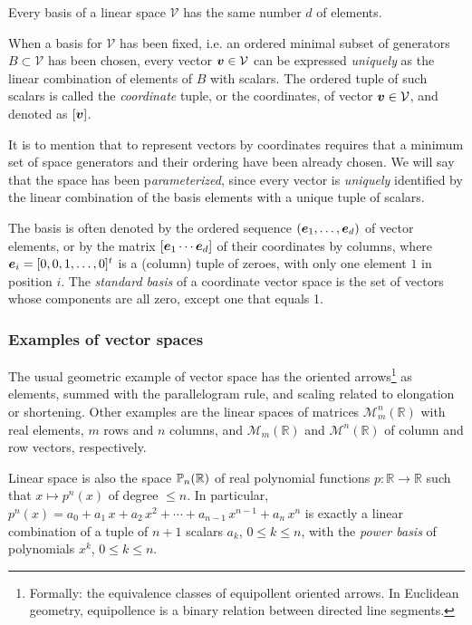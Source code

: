 Every basis of a linear space $\mathcal{V}$ has the same number $d$ of elements. 

When a basis for $\mathcal{V}$ has been fixed, i.e. an ordered minimal subset of generators ${B} \subset \mathcal{V}$  has been chosen, every vector $\v{v}\in \mathcal{V}$ can be expressed \emph{uniquely} as the linear combination of elements of ${B}$ with scalars. The ordered tuple of such scalars is called the \emph{coordinate} tuple, or the coordinates, of vector $\v{v}\in\mathcal{V}$, and denoted as $[\v{v}]$.  

\begin{remark}
It is to mention that to represent vectors by coordinates requires that a minimum set of space generators and their ordering have been already chosen. We will say that the space has been p\emph{arameterized}, since every vector is \emph{uniquely} identified by the linear combination of the basis elements with a unique tuple of scalars. 
\end{remark}

\begin{remark}
The basis is often denoted by the ordered sequence $(\v{e}_1,\ldots,\v{e}_d)$ of vector elements, or by the matrix $[\v{e}_1 \cdots \v{e}_d]$ of their coordinates by columns, where $\v{e}_i = [0, 0, 1, \ldots, 0]^t$ is a (column) tuple of zeroes, with only one element $1$ in position $i$. The \emph{standard basis} of a coordinate vector space is the set of vectors whose components are all zero, except one that equals 1.
\end{remark}




\subsubsection*{Examples of vector spaces} 

The usual geometric example of vector space has the oriented arrows\footnote{Formally: the equivalence classes of equipollent oriented arrows. In Euclidean geometry, equipollence is a binary relation between directed line segments. } as elements, summed with the parallelogram rule, and scaling related to elongation or shortening.
Other examples are the linear spaces of matrices $\mathcal{M}^n_m(\mathbb{R})$ with real elements, $m$ rows and $n$ columns, and $\mathcal{M}_m(\mathbb{R})$ and $\mathcal{M}^n(\mathbb{R})$ of column and row vectors, respectively.

Linear space is also the space $\P_n(\mathbb{R})$ of real polynomial functions $p: \mathbb{R}\to\mathbb{R}$ such that $x\mapsto p^n(x)$ of degree $\leq n$. In particular, $p^n(x) = a_0 + a_1\, x + a_2\, x^2+ \cdots + a_{n-1}\, x^{n-1} + a_{n}\, x^n$ is exactly a linear combination of a tuple of $n+1$ scalars $a_k$, $0\leq k\leq n$, with the \emph{power basis} of polynomials $x^k$, $0\leq k\leq n$. 



